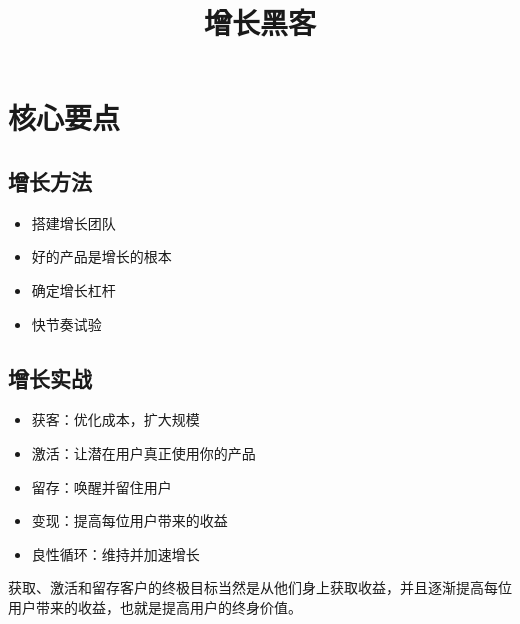 \documentclass[12pt]{article}
\title{增长黑客\cite{Hacking_Growth}}
\begin{document}
\maketitle
\tableofcontents

\section{核心要点}
\subsection{增长方法}
\begin{itemize}
\setlength{\itemsep}{0pt}
\setlength{\parsep}{0pt}
\setlength{\parskip}{0pt}
    \item 搭建增长团队
    \item 好的产品是增长的根本
    \item 确定增长杠杆
    \item 快节奏试验
\end{itemize}

\subsection{增长实战}
\begin{itemize}
\setlength{\itemsep}{0pt}
\setlength{\parsep}{0pt}
\setlength{\parskip}{0pt}
    \item 获客：优化成本，扩大规模
    \item 激活：让潜在用户真正使用你的产品
    \item 留存：唤醒并留住用户
    \item 变现：提高每位用户带来的收益
    \item 良性循环：维持并加速增长
\end{itemize}

获取、激活和留存客户的终极目标当然是从他们身上获取收益，并且逐渐提高每位用户带来的收益，也就是提高用户的终身价值。



\end{document}
